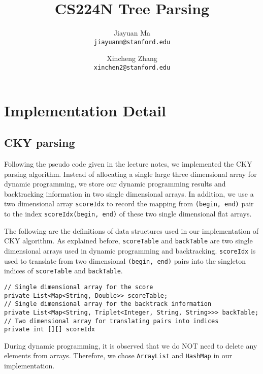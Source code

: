 \documentclass[letterpaper]{article}
\begin{document}
\title{CS224N Tree Parsing}
\author{
	Jiayuan Ma \\
	\texttt{jiayuanm@stanford.edu}
	\and
	Xincheng Zhang\\
	\texttt{xinchen2@stanford.edu}
}
\maketitle


\section{Implementation Detail}

\subsection{CKY parsing}
Following the pseudo code given in the lecture notes, we implemented the CKY parsing algorithm.  Instead of allocating a single large three dimensional array for dynamic programming, we store our dynamic programming results and backtracking information in two single dimensional arrays. 
In addition, we use a two dimensional array \texttt{scoreIdx} to record the mapping from \texttt{(begin, end)} pair to the index \texttt{scoreIdx(begin, end)} of these two single dimensional flat arrays.

\vspace{0.25cm}

The following are the definitions of data structures used in our implementation of CKY algorithm. As explained before,
\texttt{scoreTable} and \texttt{backTable} are two single dimensional arrays used in dynamic programming and backtracking. \texttt{scoreIdx} is used to translate from two dimensional \texttt{(begin, end)} pairs into the singleton indices of \texttt{scoreTable} and \texttt{backTable}.

\begin{verbatim}
// Single dimensional array for the score
private List<Map<String, Double>> scoreTable;
// Single dimensional array for the backtrack information
private List<Map<String, Triplet<Integer, String, String>>> backTable;
// Two dimensional array for translating pairs into indices
private int [][] scoreIdx
\end{verbatim}

During dynamic programming, it is observed that we do NOT need to delete any elements from arrays. Therefore, we chose \texttt{ArrayList} and \texttt{HashMap} in our implementation.
\end{document}

